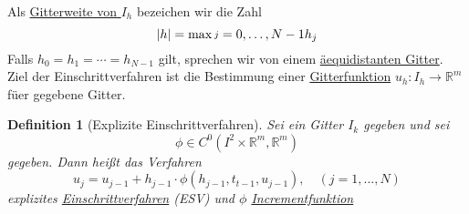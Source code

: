 \documentclass[11pt]{book}
\newcommand{\RR}{\mathbb{R}}
\theoremstyle{break}
\theoremstyle{myStyle}
\newcounter{myCounter}[chapter]
\newtheorem{Def}[myCounter]{Definition}
\begin{document}
Als \uline{Gitterweite von \( I_h  \)} bezeichen wir die Zahl \[ |h| =
  \max{\substack j = 0,\dotsc,N-1}{h_j} \]
Falls \( h_0 = h_1 = \cdots = h_{N-1} \) gilt, sprechen wir von einem
\uline{\"aequidistanten Gitter}. \\
Ziel der Einschrittverfahren ist die Bestimmung einer \uline{Gitterfunktion}
\( u_h:I_h\rightarrow\RR^m \) f\"uer gegebene Gitter.

\begin{Def}[Explizite Einschrittverfahren]
  Sei ein Gitter $I_k$ gegeben und sei \[
    \phi \in C^0(I^2\times \RR^m,\RR^m) \]
  gegeben. Dann hei\ss t das Verfahren \[
    u_j = u_{j-1} + h_{j-1} \cdot \phi (h_{j-1},t_{t-1},u_{j-1}), \quad (j = 1,\dotsc,N) \]
    explizites \uline{Einschrittverfahren} (ESV) und \( \phi \)
    \uline{Incrementfunktion}
\end{Def}
\end{document}
